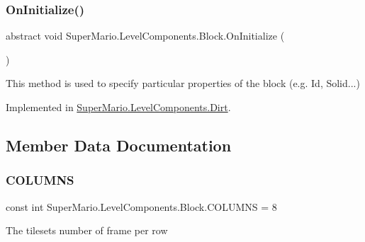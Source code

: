 \subsubsection{\texorpdfstring{On\+Initialize()}{OnInitialize()}}
{\footnotesize\ttfamily abstract void Super\+Mario.\+Level\+Components.\+Block.\+On\+Initialize (\begin{DoxyParamCaption}{ }\end{DoxyParamCaption})\hspace{0.3cm}{\ttfamily [pure virtual]}}



This method is used to specify particular properties of the block (e.\+g. Id, Solid...) 



Implemented in \mbox{\hyperlink{class_super_mario_1_1_level_components_1_1_dirt_a800acb34aa293bf29cd3e4af39020633}{Super\+Mario.\+Level\+Components.\+Dirt}}.



\subsection{Member Data Documentation}
\mbox{\label{class_super_mario_1_1_level_components_1_1_block_a43713182fbfda3b03101f02efb1d7fab}} 
\subsubsection{\texorpdfstring{C\+O\+L\+U\+M\+NS}{COLUMNS}}
{\footnotesize\ttfamily const int Super\+Mario.\+Level\+Components.\+Block.\+C\+O\+L\+U\+M\+NS = 8}



The tileset\textquotesingle{}s number of frame per row 

\mbox{\label{class_super_mario_1_1_level_components_1_1_block_a28664c83dbf40588e8d769d440969f7c}} 
